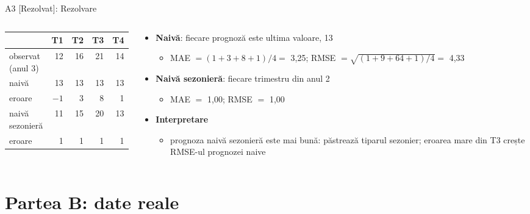 \begin{frame}{A3 [Rezolvat]: Rezolvare}
\itemsize{\footnotesize}
\begin{columns}[T]
\begin{column}{0.47\textwidth}
\begin{center}
\footnotesize
\begin{tabular}{lrrrr}
\toprule
& T1 & T2 & T3 & T4 \\
\midrule
observat (anul 3) & 12 & 16 & 21 & 14 \\
naivă & 13 & 13 & 13 & 13 \\
eroare & $-1$ & 3 & 8 & 1 \\
\midrule naivă sezonieră & 11 & 15 & 20 & 13 \\
eroare & 1 & 1 & 1 & 1 \\
\bottomrule
\end{tabular}
\end{center}

\end{column}
\begin{column}{0.50\textwidth}
\begin{itemize}
    \item \textbf{Naivă}: fiecare prognoză este ultima valoare, 13
    \begin{itemize}
        \item MAE $= (1 + 3 + 8 + 1)/4 = $ 3{,}25; RMSE $= \sqrt{(1 + 9 + 64 + 1)/4} = $ 4{,}33
    \end{itemize}
    \item \textbf{Naivă sezonieră}: fiecare trimestru din anul 2
    \begin{itemize}
        \item MAE $=$ 1{,}00; RMSE $=$ 1{,}00
    \end{itemize}
    \item \textbf{Interpretare}
    \begin{itemize}
        \item prognoza naivă sezonieră este mai bună: păstrează tiparul sezonier; eroarea mare din T3 crește RMSE-ul prognozei naive
    \end{itemize}
\end{itemize}
\end{column}
\end{columns}
\end{frame}


\section{Partea B: date reale}

